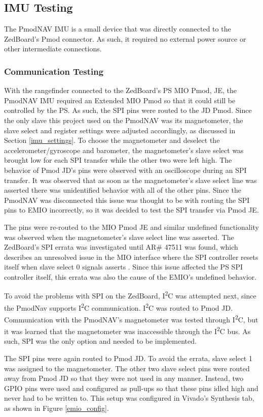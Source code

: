 \subsection{IMU Testing}
The PmodNAV IMU is a small device that was directly connected to the ZedBoard's Pmod connector. As such, it required no external power source or other intermediate connections.

\subsubsection{Communication Testing}
With the rangefinder connected to the ZedBoard's PS MIO Pmod, JE, the PmodNAV IMU required an Extended MIO Pmod so that it could still be controlled by the PS. As such, the SPI pins were routed to the JD Pmod. Since the only slave this project used on the PmodNAV was its magnetometer, the slave select and register settings were adjusted accordingly, as discussed in Section \ref{imu_settings}. To choose the magnetometer and deselect the accelerometer/gyroscope and barometer, the magnetometer's slave select was brought low for each SPI transfer while the other two were left high. The behavior of Pmod JD's pins were observed with an oscilloscope during an SPI transfer. It was observed that as soon as the magnetometer's slave select line was asserted there was unidentified behavior with all of the other pins. Since the PmodNAV was disconnected this issue was thought to be with routing the SPI pins to EMIO incorrectly, so it was decided to test the SPI transfer via Pmod JE.
\par
The pins were re-routed to the MIO Pmod JE and similar undefined functionality was observed when the magnetometer's slave select line was asserted. The ZedBoard's SPI errata was investigated until AR\# 47511 was found, which describes an unresolved issue in the MIO interface where the SPI controller resets itself when slave select 0 signals asserts \cite{zedboardErrata}. Since this issue affected the PS SPI controller itself, this errata was also the cause of the EMIO's undefined behavior.
\par
To avoid the problems with SPI on the ZedBoard, I\textsuperscript{2}C was attempted next, since the PmodNav supports I\textsuperscript{2}C communication. I\textsuperscript{2}C was routed to Pmod JD. Communication with the PmodNAV's magnetometer was tested through I\textsuperscript{2}C, but it was learned that the magnetometer was inaccessible through the I\textsuperscript{2}C bus. As such, SPI was the only option and needed to be implemented.
\par
The SPI pins were again routed to Pmod JD. To avoid the errata, slave select 1 was assigned to the magnetometer. The other two slave select pins were routed away from Pmod JD so that they were not used in any manner. Instead, two GPIO pins were used and configured as pull-ups so that these pins idled high and never had to be written to. This setup was configured in Vivado's Synthesis tab, as shown in Figure \ref{emio_config}. 

